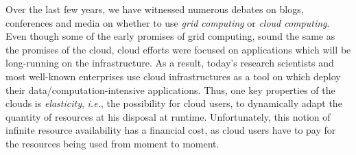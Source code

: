 


Over the last few years, we have witnessed numerous debates on blogs, conferences and media on whether to use \emph{grid computing} or \emph{cloud computing}.  Even though some of the early promises of grid computing, sound the same as the promises of the cloud, cloud efforts were focused on applications which will be long-running on the infrastructure. As a result, today's research scientists and most well-known enterprises use cloud infrastructures as a tool on which deploy their data/computation-intensive applications. Thus, one key properties of the clouds is \emph{elasticity}, \emph{i.e.}, the possibility for cloud users, to dynamically adapt the quantity of resources at his disposal at runtime.  Unfortunately, this notion of infinite resource availability has a financial cost, as cloud users have to pay for the resources being used from moment to moment.


